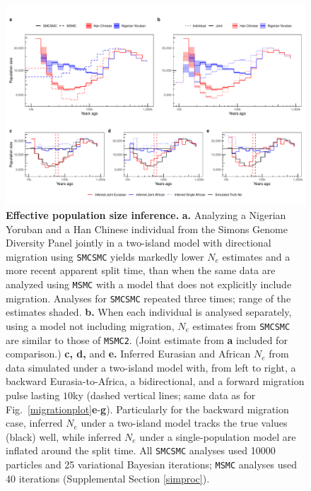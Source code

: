 \documentclass{article}
\begin{document}
\clearpage
\begin{figure}
	\centering
	\includegraphics[width=\textwidth]{plot/new_ne_figure.pdf}
	\caption{{\bf Effective population size inference.} {\bf a.} Analyzing a Nigerian Yoruban and a Han Chinese individual from the Simons Genome Diversity Panel jointly in a two-island model with directional migration using {\tt SMCSMC} yields markedly lower $N_e$ estimates and a more recent apparent split time, than when the same data are analyzed using {\tt MSMC} with a model that does not explicitly include migration. Analyses for {\tt SMCSMC} repeated three times; range of the estimates shaded. {\bf b.} When each individual is analysed separately, using a model not including migration, $N_e$ estimates from {\tt SMCSMC} are similar to those of {\tt MSMC2}. (Joint estimate from {\bf a} included for comparison.) {\bf c, d,} and {\bf e.} 
	Inferred Eurasian and African $N_e$ from data simulated under a two-island model with, from left to right, a backward Eurasia-to-Africa, a bidirectional, and a forward  migration pulse lasting $10$ky (dashed vertical lines; same data as for Fig.\ \ref{migrationplot}{\bf e}-{\bf g}).  Particularly for the backward migration case, inferred $N_e$ under a two-island model tracks the true values (black) well, while inferred $N_e$ under a single-population model are inflated around the split time.
 All {\tt SMCSMC} analyses used 10000 particles and 25 variational Bayesian iterations; {\tt MSMC} analyses used 40 iterations (Supplemental Section \ref{simproc}).}

\end{figure}
\end{document}

